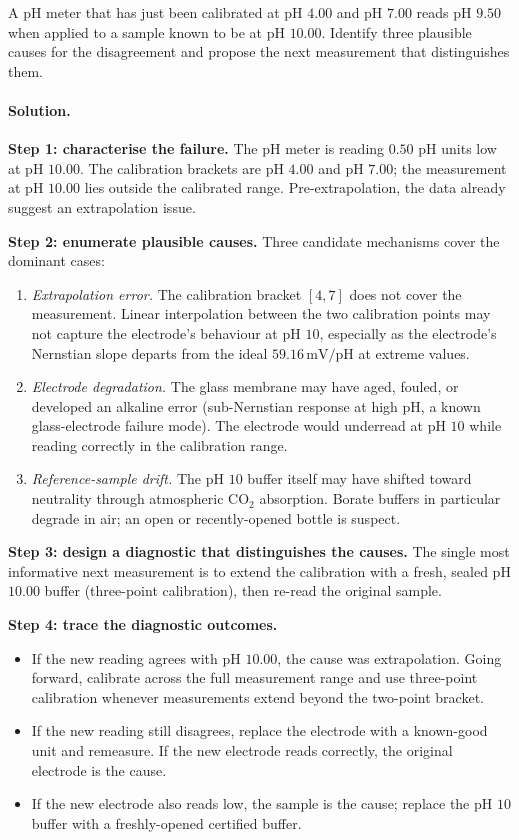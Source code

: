 \begin{exercise}
A pH meter that has just been calibrated at pH $4.00$ and pH $7.00$
reads pH $9.50$ when applied to a sample known to be at pH $10.00$.
Identify three plausible causes for the disagreement and propose
the next measurement that distinguishes them.

\paragraph{Solution.}
\textbf{Step 1: characterise the failure.} The pH meter is reading
$0.50$ pH units low at pH $10.00$. The calibration brackets are
pH $4.00$ and pH $7.00$; the measurement at pH $10.00$ lies
outside the calibrated range. Pre-extrapolation, the data already
suggest an extrapolation issue.

\textbf{Step 2: enumerate plausible causes.} Three candidate
mechanisms cover the dominant cases:
\begin{enumerate}
  \item \emph{Extrapolation error.} The calibration bracket
  $[4, 7]$ does not cover the measurement. Linear interpolation
  between the two calibration points may not capture the
  electrode's behaviour at pH $10$, especially as the electrode's
  Nernstian slope departs from the ideal $59.16 \,\si{\milli\volt}
  /$pH at extreme values.
  \item \emph{Electrode degradation.} The glass membrane may have
  aged, fouled, or developed an alkaline error (sub-Nernstian
  response at high pH, a known glass-electrode failure mode). The
  electrode would underread at pH $10$ while reading correctly in
  the calibration range.
  \item \emph{Reference-sample drift.} The pH $10$ buffer itself
  may have shifted toward neutrality through atmospheric CO$_{2}$
  absorption. Borate buffers in particular degrade in air; an open
  or recently-opened bottle is suspect.
\end{enumerate}

\textbf{Step 3: design a diagnostic that distinguishes the causes.}
The single most informative next measurement is to extend the
calibration with a fresh, sealed pH $10.00$ buffer (three-point
calibration), then re-read the original sample.

\textbf{Step 4: trace the diagnostic outcomes.}
\begin{itemize}
  \item If the new reading agrees with pH $10.00$, the cause was
  extrapolation. Going forward, calibrate across the full
  measurement range and use three-point calibration whenever
  measurements extend beyond the two-point bracket.
  \item If the new reading still disagrees, replace the electrode
  with a known-good unit and remeasure. If the new electrode reads
  correctly, the original electrode is the cause.
  \item If the new electrode also reads low, the sample is the
  cause; replace the pH $10$ buffer with a freshly-opened
  certified buffer.
\end{itemize}


\end{exercise}
